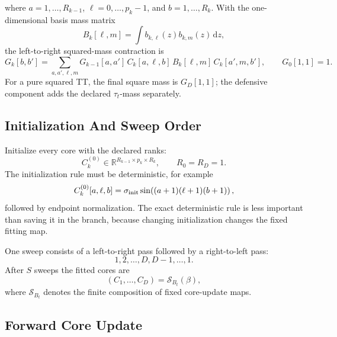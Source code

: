 \documentclass[11pt]{article}
\numberwithin{equation}{section}
\newcommand{\R}{\mathbb R}
\newcommand{\dd}{\,\mathrm d}
\begin{document}
where \(a=1,\ldots,R_{k-1}\), \(\ell=0,\ldots,p_k-1\), and
\(b=1,\ldots,R_k\).  With the one-dimensional basis mass matrix
\begin{equation}
    B_k[\ell,m]=\int b_{k,\ell}(z)b_{k,m}(z)\dd z,
    \label{eq:p25-ls-basis-mass}
\end{equation}
the left-to-right squared-mass contraction is
\begin{equation}
    G_k[b,b']
    =
    \sum_{a,a',\ell,m}
    G_{k-1}[a,a']\,
    C_k[a,\ell,b]\,
    B_k[\ell,m]\,
    C_k[a',m,b'],
    \qquad G_0[1,1]=1.
    \label{eq:p25-ls-mass-contract}
\end{equation}
For a pure squared TT, the final square mass is \(G_D[1,1]\); the defensive
component adds the declared \(\tau_t\)-mass separately.

\subsection{Initialization And Sweep Order}

Initialize every core with the declared ranks:
\begin{equation}
    C_k^{(0)}\in\R^{R_{k-1}\times p_k\times R_k},
    \qquad R_0=R_D=1.
    \label{eq:p25-ls-7}
\end{equation}
The initialization rule must be deterministic, for example
\begin{equation}
    C_k^{(0)}[a,\ell,b]
    =
    \sigma_{\rm init}
    \sin\!\left((a+1)(\ell+1)(b+1)\right),
    \label{eq:p25-ls-8}
\end{equation}
followed by endpoint normalization.  The exact deterministic rule is less
important than saving it in the branch, because changing initialization changes
the fixed fitting map.

One sweep consists of a left-to-right pass followed by a right-to-left pass:
\begin{equation}
    1,2,\ldots,D,D-1,\ldots,1.
    \label{eq:p25-ls-9}
\end{equation}
After \(S\) sweeps the fitted cores are
\begin{equation}
    (C_1,\ldots,C_D)
    =
    \mathcal S_{B_t}(\beta),
    \label{eq:p25-ls-10}
\end{equation}
where \(\mathcal S_{B_t}\) denotes the finite composition of fixed core-update
maps.

\subsection{Forward Core Update}
\end{document}
